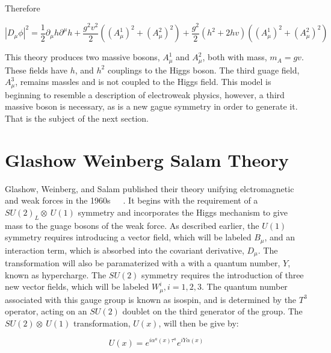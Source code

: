 \noindent Therefore

\begin{equation}\label{eq:non_abelian_higgs_mechanism_covariant_derivative_sq}
|D_{\mu}\phi|^{2} = \frac{1}{2}\partial_{\mu}h\partial^{\mu}h +
\frac{g^{2}v^{2}}{2}\left( (A_{\mu}^{1})^{2} + (A_{\mu}^{2})^{2} \right) +
\frac{g^{2}}{2}(h^{2}+2hv)\left( (A_{\mu}^{1})^{2} + (A_{\mu}^{2})^{2} \right)
\end{equation}

\par This theory produces two massive bosons, $A_{\mu}^{1}$ and
$A_{\mu}^{2}$, both with mass, $m_{A} = gv$.  These fields have $h$,
and $h^2$ couplings to the Higgs boson.  The third guage field,
$A_{\mu}^{3}$, remains massles and is not coupled to the Higgs field.
This model is beginning to resemble a description of electroweak
physics, however, a third massive boson is necessary, as is a new
gague symmetry in order to generate it.  That is the subject of the
next section.  

\section{Glashow Weinberg Salam Theory}
\label{ewk_overview}

\par Glashow, Weinberg, and Salam published their theory unifying
elctromagnetic and weak forces in the
1960s~\cite{th:Weinberg_ModelOfLeptons}~\cite{th:Glashow_PartialSymmetries}~\cite{th:Salam_EWKInteractions}.
It begins with the requirement of a $SU(2)_{L}\otimes~U(1)$
symmetry and incorporates the Higgs mechanism to give mass to the guage bosons
of the weak force.  As described earlier, the $U(1)$ symmetry requires
introducing a vector field, which will be labeled $B_{\mu}$, and an interaction term, which
is absorbed into the covariant derivative, $D_{\mu}$.  The
transformation will also be paramaterized with a with a quantum
number, $Y$, known as hypercharge.  The $SU(2)$
symmetry requires the introduction of three new 
vector fields, which will be labeled $W_{\mu}^{i}, i = 1, 2, 3$.  The
quantum number associated with this gauge group is known as isospin,
and is determined by the $T^{3}$ operator, acting on an $SU(2)$
doublet on the third generator of the group. The $SU(2)\otimes~U(1)$
transformation, $U(x)$, will then be give by:   

\begin{equation}\label{eq:ewk_su2_su1_transformation}
U(x) = e^{i\alpha^{a}(x)\tau^{a}}e^{iY\alpha(x)}
\end{equation}


